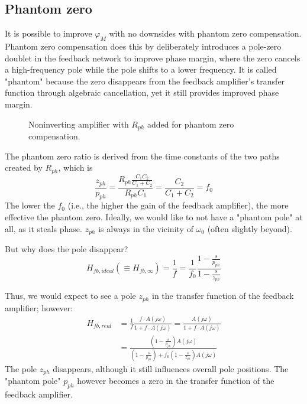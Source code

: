 \documentclass[12pt, a4paper]{article}%
\begin{document}
\subsection{Phantom zero}
It is possible to improve $\varphi_M$ with no downsides with phantom zero compensation. Phantom zero compensation does this by deliberately introduces a pole-zero doublet in the feedback network to improve phase margin, where the zero cancels a high-frequency pole while the pole shifts to a lower frequency. It is called "phantom" because the zero disappears from the feedback amplifier's transfer function through algebraic cancellation, yet it still provides improved phase margin.

\begin{figure}[H]
    \centering
        \resizebox{0.5\linewidth}{!}{
      
    }
    \caption{Noninverting amplifier with $R_{ph}$ added for phantom zero compensation.}
    \label{fig:phantom opamp}
\end{figure}
The phantom zero ratio is derived from the time constants of the two paths created by $R_{ph}$, which is
\begin{equation}
\frac{z_{ph}}{p_{ph}} = \frac{R_{ph} \frac{C_1 C_2}{C_1 + C_2}}{R_{ph} C_1} = \frac{C_2}{C_1 + C_2} = f_0
\end{equation}
The lower the $f_0$ (i.e., the higher the gain of the feedback amplifier), the more effective the phantom zero. Ideally, we would like to not have a "phantom pole" at all, as it steals phase. $z_{ph}$ is always in the vicinity of $\omega_0$ (often slightly beyond).

But why does the pole disappear?
\begin{equation}
H_{fb,ideal} (\equiv H_{fb,\infty}) = \frac{1}{f} = \frac{1}{f_0} \frac{1 - \frac{s}{p_{ph}}}{1 - \frac{s}{z_{ph}}}
\end{equation}

Thus, we would  expect to see a  pole $z_{ph}$ in the transfer function of the feedback amplifier; however:
\begin{align}
H_{fb,real} &= \frac{1}{f} \frac{f \cdot A(j\omega)}{1 + f \cdot A(j\omega)} = \frac{A(j\omega)}{1 + f \cdot A(j\omega)} \\
&= \frac{\left( 1 - \frac{s}{p_{ph}} \right) A(j\omega)}{\left( 1 - \frac{s}{p_{ph}} \right) + f_0 \left( 1 - \frac{s}{z_{ph}} \right) A(j\omega)}
\end{align}
The pole $z_{ph}$ disappears, although it still influences overall pole positions. The "phantom pole" $p_{ph}$ however becomes a zero in the transfer function of the feedback amplifier.
\end{document}
